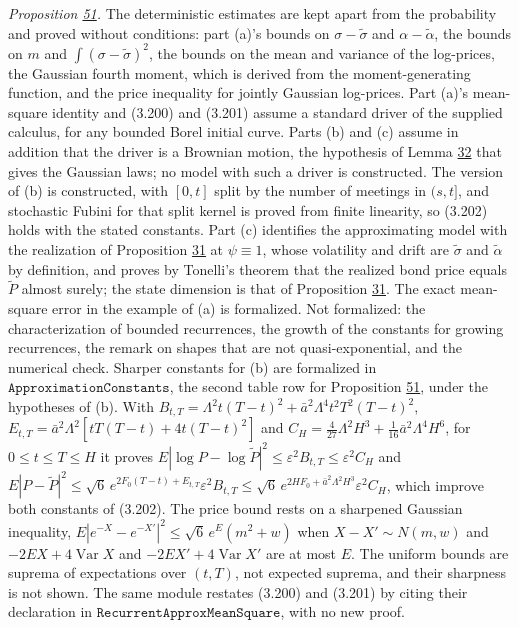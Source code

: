 \documentclass[11pt]{article}
\begin{document}
\emph{Proposition \hyperref[res:Proposition-51]{51}.} The deterministic estimates are kept apart from the probability and proved without conditions: part (a)'s bounds on \(\sigma-\tilde\sigma\) and \(\alpha-\tilde\alpha\), the bounds on \(m\) and \(\int(\sigma-\tilde\sigma)^2\), the bounds on the mean and variance of the log-prices, the Gaussian fourth moment, which is derived from the moment-generating function, and the price inequality for jointly Gaussian log-prices. Part (a)'s mean-square identity and (3.200) and (3.201) assume a standard driver of the supplied calculus, for any bounded Borel initial curve. Parts (b) and (c) assume in addition that the driver is a Brownian motion, the hypothesis of Lemma \hyperref[res:Lemma-32]{32} that gives the Gaussian laws; no model with such a driver is constructed. The version of (b) is constructed, with \([0,t]\) split by the number of meetings in \((s,t]\), and stochastic Fubini for that split kernel is proved from finite linearity, so (3.202) holds with the stated constants. Part (c) identifies the approximating model with the realization of Proposition \hyperref[res:Proposition-31]{31} at \(\psi\equiv1\), whose volatility and drift are \(\tilde\sigma\) and \(\tilde\alpha\) by definition, and proves by Tonelli's theorem that the realized bond price equals \(\tilde P\) almost surely; the state dimension is that of Proposition \hyperref[res:Proposition-31]{31}. The exact mean-square error in the example of (a) is formalized. Not formalized: the characterization of bounded recurrences, the growth of the constants for growing recurrences, the remark on shapes that are not quasi-exponential, and the numerical check. Sharper constants for (b) are formalized in \(\texttt{ApproximationConstants}\), the second table row for Proposition \hyperref[res:Proposition-51]{51}, under the hypotheses of (b). With \(B_{t,T}=\Lambda^2t(T-t)^2+\bar a^2\Lambda^4t^2T^2(T-t)^2\), \(E_{t,T}=\bar a^2\Lambda^2[tT(T-t)+4t(T-t)^2]\) and \(C_H=\tfrac4{27}\Lambda^2H^3+\tfrac1{16}\bar a^2\Lambda^4H^6\), for \(0\le t\le T\le H\) it proves \(E|\log P-\log\tilde P|^2\le\varepsilon^2B_{t,T}\le\varepsilon^2C_H\) and \(E|P-\tilde P|^2\le\sqrt6\,e^{2F_0(T-t)+E_{t,T}}\varepsilon^2B_{t,T}\le\sqrt6\,e^{2HF_0+\bar a^2\Lambda^2H^3}\varepsilon^2C_H\), which improve both constants of (3.202). The price bound rests on a sharpened Gaussian inequality, \(E|e^{-X}-e^{-X'}|^2\le\sqrt6\,e^{E}(m^2+w)\) when \(X-X'\sim N(m,w)\) and \(-2EX+4\operatorname{Var}X\) and \(-2EX'+4\operatorname{Var}X'\) are at most \(E\). The uniform bounds are suprema of expectations over \((t,T)\), not expected suprema, and their sharpness is not shown. The same module restates (3.200) and (3.201) by citing their declaration in \(\texttt{RecurrentApproxMeanSquare}\), with no new proof.
\end{document}

